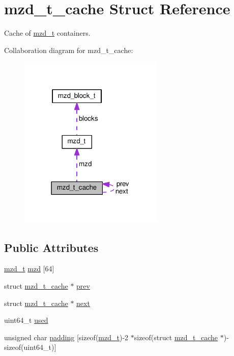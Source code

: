 \hypertarget{structmzd__t__cache}{}\section{mzd\+\_\+t\+\_\+cache Struct Reference}
\label{structmzd__t__cache}


Cache of \hyperlink{structmzd__t}{mzd\+\_\+t} containers.  




Collaboration diagram for mzd\+\_\+t\+\_\+cache\+:
\nopagebreak
\begin{figure}[H]
\begin{center}
\leavevmode
\includegraphics[width=195pt]{structmzd__t__cache__coll__graph}
\end{center}
\end{figure}
\subsection*{Public Attributes}
\begin{DoxyCompactItemize}
\item 
\hyperlink{structmzd__t}{mzd\+\_\+t} \hyperlink{structmzd__t__cache_a2ecb1f99e88c241041f5736702f7ed54}{mzd} \mbox{[}64\mbox{]}
\item 
struct \hyperlink{structmzd__t__cache}{mzd\+\_\+t\+\_\+cache} $\ast$ \hyperlink{structmzd__t__cache_af03b3b89df5ea816faeb98633c29ade7}{prev}
\item 
struct \hyperlink{structmzd__t__cache}{mzd\+\_\+t\+\_\+cache} $\ast$ \hyperlink{structmzd__t__cache_afbe21f2087b595ae7aa22e500b36e570}{next}
\item 
uint64\+\_\+t \hyperlink{structmzd__t__cache_a06d198f654e655c6c59801676aa1bd39}{used}
\item 
unsigned char \hyperlink{structmzd__t__cache_a1c7ca8f1b754eff42424287003ae8351}{padding} \mbox{[}sizeof(\hyperlink{structmzd__t}{mzd\+\_\+t})-\/2 $\ast$sizeof(struct \hyperlink{structmzd__t__cache}{mzd\+\_\+t\+\_\+cache} $\ast$)-\/sizeof(uint64\+\_\+t)\mbox{]}
\end{DoxyCompactItemize}


